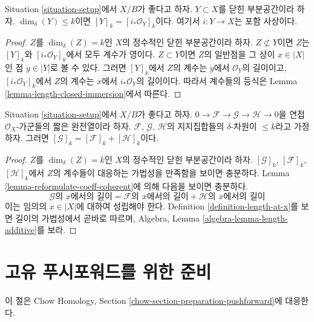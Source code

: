 \begin{lemma}
\label{lemma-cycle-closed-coherent}
Situation \ref{situation-setup}에서 $X/B$가 좋다고 하자.
$Y \subset X$를 닫힌 부분공간이라 하자. $\dim_\delta(Y) \leq k$이면
$[Y]_k = [i_*\mathcal{O}_Y]_k$이다. 여기서 $i : Y \to X$는 포함 사상이다.
\end{lemma}

\begin{proof}
$Z$를 $\dim_\delta(Z) = k$인 $X$의 정수적인 닫힌 부분공간이라 하자.
$Z \not \subset Y$이면 $Z$는 $[Y]_k$와 $[i_*\mathcal{O}_Y]_k$에서 모두
계수가 영이다. $Z \subset Y$이면 $Z$의 일반점을 그 상이 $x \in |X|$인
점 $y \in |Y|$로 볼 수 있다. 그러면 $[Y]_k$에서 $Z$의 계수는
$y$에서 $\mathcal{O}_Y$의 길이이고, $[i_*\mathcal{O}_Y]_k$에서
$Z$의 계수는 $x$에서 $i_*\mathcal{O}_Y$의 길이이다. 따라서 계수들의
등식은 Lemma \ref{lemma-length-closed-immersion}에서 따른다.
\end{proof}

\begin{lemma}
\label{lemma-additivity-sheaf-cycle}
Situation \ref{situation-setup}에서 $X/B$가 좋다고 하자.
$0 \to \mathcal{F} \to \mathcal{G} \to \mathcal{H} \to 0$을 연접
$\mathcal{O}_X$-가군들의 짧은 완전열이라 하자. $\mathcal{F}$,
$\mathcal{G}$, $\mathcal{H}$의 지지집합들의 $\delta$-차원이
$\leq k$라고 가정하자. 그러면
$[\mathcal{G}]_k = [\mathcal{F}]_k + [\mathcal{H}]_k$이다.
\end{lemma}

\begin{proof}
$Z$를 $\dim_\delta(Z) = k$인 $X$의 정수적인 닫힌 부분공간이라 하자.
$[\mathcal{G}]_k$, $[\mathcal{F}]_k$, $[\mathcal{H}]_k$에서 $Z$의
계수들이 대응하는 가법성을 만족함을 보이면 충분하다. Lemma
\ref{lemma-reformulate-coeff-coherent}에 의해 다음을 보이면 충분하다.
$$
\mathcal{G}\text{의 }x\text{에서의 길이} =
\mathcal{F}\text{의 }x\text{에서의 길이} +
\mathcal{H}\text{의 }x\text{에서의 길이}
$$
이는 임의의 $x \in |X|$에 대하여 성립해야 한다. Definition
\ref{definition-length-at-x}를 보면 길이의 가법성에서 곧바로 따르며,
Algebra, Lemma \ref{algebra-lemma-length-additive}를 보라.
\end{proof}



\section{고유 푸시포워드를 위한 준비}
\label{section-preparation-pushforward}

\noindent
이 절은 Chow Homology, Section
\ref{chow-section-preparation-pushforward}에 대응한다.

